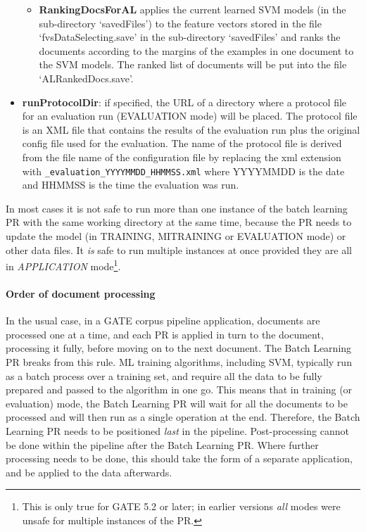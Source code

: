 \begin{itemize}
\begin{itemize}
\item {\bf RankingDocsForAL} applies the current learned SVM models (in the
sub-directory `savedFiles') to the feature vectors stored in the file
`fvsDataSelecting.save' in the sub-directory `savedFiles' and ranks the
documents according to the margins of the examples in one document to the SVM
models. The ranked list of documents will be put into the file
`ALRankedDocs.save'.

\end{itemize}

\item {\bf runProtocolDir}: if specified, the URL of a directory where 
a protocol file for an evaluation run (EVALUATION mode) will be placed. 
The protocol file is an XML file that contains the results of the evaluation
run plus the original config file used for the evaluation.  The name of the
protocol file is derived from the file name of the configuration file by
replacing the xml extension with \verb=_evaluation_YYYYMMDD_HHMMSS.xml= 
where YYYYMMDD is the date and HHMMSS is the time the evaluation was run.

\end{itemize}

In most cases it is not safe to run more than one instance of the batch
learning PR with the same working directory at the same time, because the PR
needs to update the model (in TRAINING, MITRAINING or EVALUATION mode) or other
data files.  It {\it is} safe to run multiple instances at once provided they
are all in {\it APPLICATION} mode\footnote{This is only true for GATE 5.2
or later; in earlier versions {\it all} modes were unsafe
for multiple instances of the PR.}.

\paragraph{Order of document processing}

In the usual case, in a GATE corpus pipeline application, documents are processed
one at a time, and each PR is applied in turn to the document, processing it
fully, before moving on to the next document. The Batch Learning PR breaks from this rule. ML
training algorithms, including SVM, typically run as a batch process over a
training set, and require all the data to be fully prepared and passed to the
algorithm in one go. This means that in training (or evaluation) mode,
the Batch Learning PR will wait for all the documents to be processed and will then run as a
single operation at the end. Therefore, the Batch Learning PR needs to be positioned
\textit{last} in the pipeline. Post-processing cannot be done within the pipeline
after the Batch Learning PR. Where further processing needs to be done, this should take the
form of a separate application, and be applied to the data afterwards.

